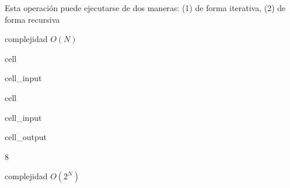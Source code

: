 \documentclass[letterpaper,10pt,english]{jupyterBook}
\begin{document}
\sphinxAtStartPar
Esta operación puede ejecutarse de dos maneras: (1) de forma iterativa, (2) de forma recursiva

\sphinxAtStartPar
{} complejidad \(O(N)\)

\begin{sphinxuseclass}{cell}\begin{sphinxVerbatimInput}

\begin{sphinxuseclass}{cell_input}
\begin{sphinxVerbatim}[commandchars=\\\{\}]
 
    
      \PYG{p}{[} \PYG{p}{]}
    
        
        \PYG{p}{[}  \PYG{p}{]}  \PYG{p}{[}  \PYG{p}{]}
        
     \PYG{p}{[}\PYG{p}{]}
\end{sphinxVerbatim}

\end{sphinxuseclass}\end{sphinxVerbatimInput}

\end{sphinxuseclass}
\begin{sphinxuseclass}{cell}\begin{sphinxVerbatimInput}

\begin{sphinxuseclass}{cell_input}
\begin{sphinxVerbatim}[commandchars=\\\{\}]
\end{sphinxVerbatim}

\end{sphinxuseclass}\end{sphinxVerbatimInput}
\begin{sphinxVerbatimOutput}

\begin{sphinxuseclass}{cell_output}
\begin{sphinxVerbatim}[commandchars=\\\{\}]
8
\end{sphinxVerbatim}

\end{sphinxuseclass}\end{sphinxVerbatimOutput}

\end{sphinxuseclass}
\sphinxAtStartPar
{} complejidad \(O\left(2^N\right)\)
\end{document}

